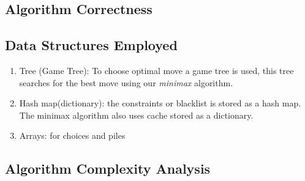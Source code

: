 \documentclass{article}
\begin{document}
\subsection*{Algorithm Correctness}

\subsection*{Data Structures Employed}
\begin{enumerate}
  \item Tree (Game Tree): To choose optimal move a game tree is used, this tree searches for the best move using our \textit{minimax} algorithm. 
  \item Hash map(dictionary): the constraints or blacklist is stored as a hash map. The minimax algorithm also uses cache stored as a dictionary. 
  \item Arrays: for choices and piles
\end{enumerate}
\subsection*{Algorithm Complexity Analysis}
\end{document}

